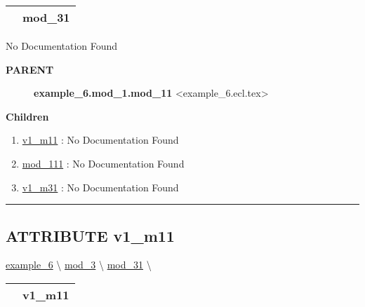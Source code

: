 {\renewcommand{\arraystretch}{1.5}
\begin{tabularx}{\textwidth}{|>{\raggedright\arraybackslash}l|X|}
\hline
\hspace{0pt}\mytexttt{\color{red} } & \textbf{mod\_31} \\
\hline
\end{tabularx}
}

\par





No Documentation Found










\par
\begin{description}
\item [\colorbox{tagtype}{\color{white} \textbf{\textsf{PARENT}}}] \textbf{example\_6.mod\_1.mod\_11} <example\_6.ecl.tex>
\end{description}


\textbf{Children}
\begin{enumerate}
\item \hyperlink{ecldoc:example_6.mod_1.mod_11.v1_m11}{v1\_m11}
: No Documentation Found
\item \hyperlink{ecldoc:example_6.mod_1.mod_11.mod_111}{mod\_111}
: No Documentation Found
\item \hyperlink{ecldoc:example_6.mod_3.mod_31.v1_m31}{v1\_m31}
: No Documentation Found
\end{enumerate}

\rule{\linewidth}{0.5pt}

\subsection*{\textsf{\colorbox{headtoc}{\color{white} ATTRIBUTE}
v1\_m11}}

\hypertarget{ecldoc:example_6.mod_1.mod_11.v1_m11}{}
\hspace{0pt} \hyperlink{ecldoc:example_6}{example_6} \textbackslash 
\hspace{0pt} \hyperlink{ecldoc:example_6.mod_3}{mod_3} \textbackslash 
\hspace{0pt} \hyperlink{ecldoc:example_6.mod_3.mod_31}{mod_31} \textbackslash 

{\renewcommand{\arraystretch}{1.5}
\begin{tabularx}{\textwidth}{|>{\raggedright\arraybackslash}l|X|}
\hline
\hspace{0pt}\mytexttt{\color{red} } & \textbf{v1\_m11} \\
\hline
\end{tabularx}
}

